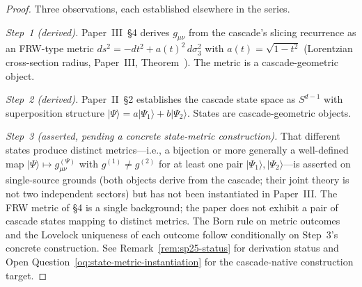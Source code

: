 \documentclass[12pt,a4paper]{article}
\begin{document}
\begin{proof}
Three observations, each established elsewhere in the series.

\emph{Step~1 (derived).} Paper~III~\S4 derives $g_{\mu\nu}$ from the
cascade's slicing recurrence as an FRW-type metric
$ds^2 = -dt^2 + a(t)^2\,d\sigma_3^2$ with $a(t) = \sqrt{1-t^2}$
(Lorentzian cross-section radius, Paper~III, Theorem~).
The metric is a cascade-geometric object.

\emph{Step~2 (derived).} Paper~II~\S2 establishes the cascade state space
as $S^{d-1}$ with superposition structure $|\Psi\rangle = a|\Psi_1\rangle
+ b|\Psi_2\rangle$. States are cascade-geometric objects.

\emph{Step~3 (asserted, pending a concrete state-metric construction).}
That different states produce distinct metrics---i.e., a bijection or
more generally a well-defined map
$|\Psi\rangle \mapsto g_{\mu\nu}^{(\Psi)}$ with
$g^{(1)}\neq g^{(2)}$ for at least one pair
$|\Psi_1\rangle,|\Psi_2\rangle$---is asserted on single-source grounds
(both objects derive from the cascade; their joint theory is not two
independent sectors) but has not been instantiated in Paper~III. The FRW
metric of \S4 is a single background; the paper does not exhibit a pair
of cascade states mapping to distinct metrics. The Born rule on metric
outcomes and the Lovelock uniqueness of each outcome follow
conditionally on Step~3's concrete construction. See
Remark~\ref{rem:sp25-status} for derivation status and
Open Question~\ref{oq:state-metric-instantiation} for the cascade-native
construction target.
\end{proof}
\end{document}
